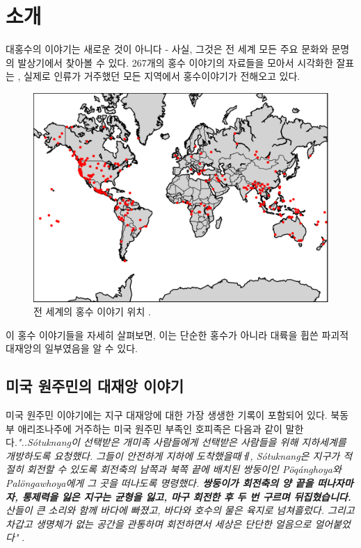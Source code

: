\documentclass[10pt,twocolumn,letterpaper]{article}
\begin{document}
\section{소개}

대홍수의 이야기는 새로운 것이 아니다 - 사실, 그것은 전 세계 모든 주요 문화와 문명의 발상기에서 찾아볼 수 있다. 267개의 홍수 이야기의 자료들을 모아서 시각화한 잘표는  \cite{3}, 실제로  인류가 거주했던 모든 지역에서 홍수이야기가 전해오고 있다.

\begin{figure}[h]
\begin{center}
   \includegraphics[width=1\linewidth]{b.png}
\end{center}
   \caption{전 세계의 홍수 이야기 위치 \cite{3}.}
\label{fig:1}
\label{fig:onecol}
\end{figure}

이 홍수 이야기들을 자세히 살펴보면, 이는 단순한 홍수가 아니라 대륙을 휩쓴 파괴적 대재앙의 일부였음을 알 수 있다.

\subsection{미국 원주민의 대재앙 이야기}

미국 원주민 이야기에는 지구 대재앙에 대한 가장 생생한 기록이 포함되어 있다. 북동부 애리조나주에 거주하는 미국 원주민 부족인 호피족은 다음과 같이 말한다.\textit{"..Sótuknang이 선택받은 개미족 사람들에게 선택받은 사람들을 위해 지하세계를 개방하도록 요청했다. 그들이 안전하게 지하에 도착했을때ㅔ, Sótuknang은 지구가 적절히 회전할 수 있도록 회전축의 남쪽과 북쪽 끝에 배치된 쌍둥이인 Pöqánghoya와 Palöngawhoya에게 그 곳을 떠나도록 명령했다. \textbf{쌍둥이가 회전축의 양 끝을 떠나자마자, 통제력을 잃은 지구는 균형을 잃고,  마구 회전한 후 두 번 구르며 뒤집혔습니다.} 산들이 큰 소리와 함께 바다에 빠졌고, 바다와 호수의 물은 육지로 넘쳐흘렀다. 그리고 차갑고 생명체가 없는 공간을 관통하며 회전하면서 세상은 단단한 얼음으로 얼어붙었다"} \cite{4}.
\end{document}
